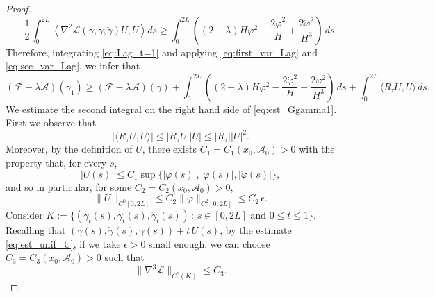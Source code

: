 \documentclass[11pt]{amsart}
\renewcommand{\leq}{\leqslant}
\renewcommand{\geq}{\geqslant}
\newcommand{\A}{\mathcal A}
\newcommand{\cA}{\A}
\newcommand{\Lag}{\mathscr{L}}
\renewcommand{\phi}{\varphi}
\theoremstyle{definition}
\theoremstyle{remark}
\numberwithin{equation}{section}
\begin{document}
\begin{proof}
\begin{equation} \label{eq:sec_var_Lag}
\dfrac{1}{2} \int_0^{2L} \left \langle \nabla^2 \Lag(\gamma, \dot \gamma, \ddot \gamma) U, U \right \rangle ds \geq \int_0^{2L}\left((2-\lambda)H\varphi^2-\frac{2\dot\varphi^2}{H}+\frac{2\ddot\varphi^2}{H^3}\right)\,ds.
\end{equation}
Therefore, integrating \eqref{eq:Lag_t=1} and applying \eqref{eq:first_var_Lag} and \eqref{eq:sec_var_Lag}, we infer that
\begin{equation} \label{eq:est_Ggamma1}
(\mathcal F-\lambda  \A )(\gamma_1) \geq (\mathcal F-\lambda  \A )(\gamma) + \int_0^{2L}\left((2-\lambda)H\varphi^2-\frac{2\dot\varphi^2}{H}+\frac{2\ddot\varphi^2}{H^3}\right)\,ds + \int_0^{2L} \langle R_{\tau} U, U \rangle \, ds .
\end{equation}
We estimate the second integral on the right hand side of \eqref{eq:est_Ggamma1}. First we observe that 
\begin{equation} \label{eq:CS_estim}
\left | \langle R_{\tau} U , U \rangle \right | \leq \left | R_{\tau} U \right | \left | U \right | \leq \left | R_{\tau} \right | \left | U \right |^2 .
\end{equation}
Moreover, by the definition of $U$, there exists $C_1 = C_1(x_0,\cA_0) > 0$ with the property that, for every $s$,
\begin{equation} \label{eq:pw_est_U}
|U(s)| \leq C_1 \sup \{ |\phi(s)|, |\dot \phi(s)|, |\ddot \phi(s)| \} , %
\end{equation}
and so in particular, for some $C_2 = C_2(x_0,\A_0) > 0$,
\begin{equation} \label{eq:est_unif_U}
\|U\|_{C^0[0,2L]} \leq C_2 \| \phi \|_{C^2[0,2L]} \leq C_2 \, \epsilon .
\end{equation}
Consider
$K := \{ (\gamma_t(s), \dot \gamma_t(s), \ddot \gamma_t(s)) \, : \, s \in [0,2L] \, \, \text{and} \, \, 0 \leq t \leq 1 \}$.
Recalling that $(\gamma(s), \dot \gamma(s), \ddot \gamma(s)) + t \, U(s)$, by the estimate \eqref{eq:est_unif_U}, if we take $\epsilon > 0$ small enough, we can choose $C_3 = C_3(x_0,\cA_0) > 0$ such that
\begin{equation*}
\| \nabla^3 \Lag \|_{C^0(K)} \leq C_3 .
\end{equation*}

\end{proof}
\end{document}
